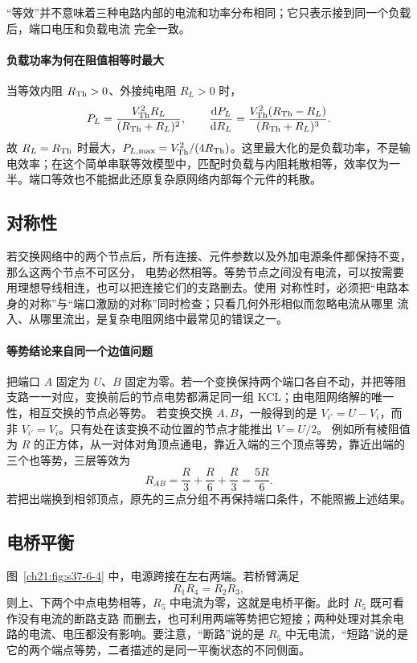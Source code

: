 {“等效”并不意味着三种电路内部的电流和功率分布相同；它只表示接到同一个负载后，端口电压和负载电流
完全一致。


\paragraph{负载功率为何在阻值相等时最大}
当等效内阻 $R_{\rm Th}>0$、外接纯电阻 $R_L>0$ 时，
\[
 P_L=\frac{V_{\rm Th}^2R_L}{(R_{\rm Th}+R_L)^2},\qquad
 \frac{\mathop{}\!\mathrm d P_L}{\mathop{}\!\mathrm d R_L}
 =\frac{V_{\rm Th}^2(R_{\rm Th}-R_L)}{(R_{\rm Th}+R_L)^3}.
\]
故 $R_L=R_{\rm Th}$ 时最大，$P_{L,\max}=V_{\rm Th}^2/(4R_{\rm Th})$。这里最大化的是负载功率，不是输电效率；在这个简单串联等效模型中，匹配时负载与内阻耗散相等，效率仅为一半。端口等效也不能据此还原复杂原网络内部每个元件的耗散。


\subsection{对称性}


若交换网络中的两个节点后，所有连接、元件参数以及外加电源条件都保持不变，那么这两个节点不可区分，
电势必然相等。等势节点之间没有电流，可以按需要用理想导线相连，也可以把连接它们的支路删去。使用
对称性时，必须把“电路本身的对称”与“端口激励的对称”同时检查；只看几何外形相似而忽略电流从哪里
流入、从哪里流出，是复杂电阻网络中最常见的错误之一。


\paragraph{等势结论来自同一个边值问题}
把端口 $A$ 固定为 $U$、$B$ 固定为零。若一个变换保持两个端口各自不动，并把等阻支路一一对应，变换前后的节点电势都满足同一组 KCL；由电阻网络解的唯一性，相互交换的节点必等势。
若变换交换 $A,B$，一般得到的是 $V_{i'}=U-V_i$，而非 $V_{i'}=V_i$。只有处在该变换不动位置的节点才能推出 $V=U/2$。
例如所有棱阻值为 $R$ 的正方体，从一对体对角顶点通电，靠近入端的三个顶点等势，靠近出端的三个也等势，三层等效为
\[
 R_{AB}=\frac R3+\frac R6+\frac R3=\frac{5R}{6}.
\]
若把出端换到相邻顶点，原先的三点分组不再保持端口条件，不能照搬上述结果。


\subsection{电桥平衡}


图~\ref{ch21:fig:s37-6-4} 中，电源跨接在左右两端。若桥臂满足
\[
  \boxed{R_1R_4=R_2R_3},
\]
则上、下两个中点电势相等，$R_5$ 中电流为零，这就是电桥平衡。此时 $R_5$ 既可看作没有电流的断路支路
而删去，也可利用两端等势把它短接；两种处理对其余电路的电流、电压都没有影响。要注意，“断路”说的是
$R_5$ 中无电流，“短路”说的是它的两个端点等势，二者描述的是同一平衡状态的不同侧面。

}
